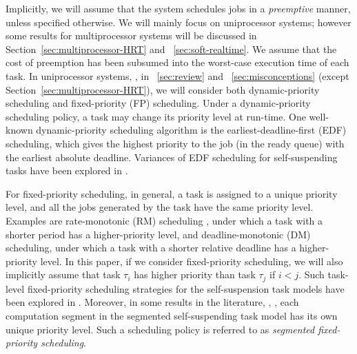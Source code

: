 


Implicitly, we will assume that the system schedules  jobs in a
\emph{preemptive} manner, unless specified otherwise.  We will mainly focus on
uniprocessor systems; however some results for multiprocessor systems
will be discussed in Section~\ref{sec:multiprocessor-HRT} and
\mysectionref{}~\ref{sec:soft-realtime}. 
We assume that the cost of preemption
has been subsumed into the worst-case execution time of each task. In
uniprocessor systems, \ie, in \mysectionref{}~\ref{sec:review} and
\mysectionref{}~\ref{sec:misconceptions} (except Section~\ref{sec:multiprocessor-HRT}), we will consider both
dynamic-priority scheduling and fixed-priority (FP)
scheduling. Under a dynamic-priority scheduling policy, 
a task may change its priority level at run-time. One well-known dynamic-priority scheduling
algorithm is the earliest-deadline-first (EDF) scheduling, which gives
the highest priority to the job (in the ready queue) with the earliest
absolute deadline. Variances of EDF scheduling for self-suspending
tasks have been explored in
\cite{RTSS-ChenL14,Liu_2014,DBLP:conf/ecrts/Devi03,WC16-suspend-DATE}.

For fixed-priority scheduling, in general, a task is assigned to a
unique priority level, and all the jobs generated by the task have the
same priority level. Examples are rate-monotonic (RM) scheduling
\cite{Liu_1973}, under which a task with a shorter period has a
higher-priority level, and deadline-monotonic (DM) scheduling, under which
a task with a shorter relative deadline has a higher-priority level.
In this paper, if we consider fixed-priority scheduling, we will also implicitly assume that task $\tau_i$ has higher priority than task $\tau_j$ if $i < j$.
Such task-level fixed-priority scheduling strategies for the self-suspension task models have been explored in
\cite{Raj:suspension1991,RTCSA-KimCPKH95,MingLiRTCSA1994,PH:rtss98,ECRTS-AudsleyB04,RTAS-AudsleyB04,RTCSA-BletsasA05,LR:rtas10,RTSS-KimANR13,LiuChen:rtss2014,huangpass:dac2015,Huang:multiseg,WC16-suspend-DATE,ChenECRTS2016-suspension}.
Moreover, in some results in the literature, \eg,
\cite{RTSS-KimANR13,DBLP:journals/ieicet/DingTT09}, each computation
segment in the segmented self-suspending task model has its own unique
priority level. Such a scheduling
policy is referred to as \emph{segmented fixed-priority scheduling}.

